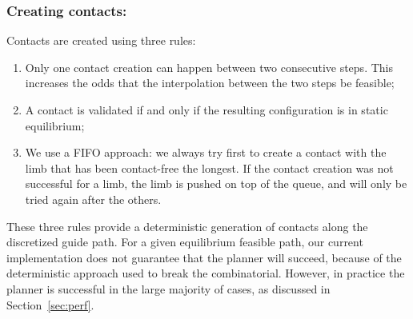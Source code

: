 \subsubsection{Creating contacts:}
Contacts are created using three rules:
\begin{enumerate}
\item Only one contact creation can happen between two consecutive steps. This increases the odds that the interpolation between the two steps be feasible;
\item A contact is validated if and only if the resulting configuration is in static equilibrium; 
\item We use a FIFO approach:  we always try first to create a contact with the limb that has been contact-free the longest. If the contact creation
was not successful for a limb, the limb is pushed on top of the queue, and will only be tried again after the others.
\end{enumerate}

These three rules provide a deterministic generation of contacts along the discretized guide path.
For a given \gls{equilibrium feasible} path, our current implementation does not guarantee that the planner will succeed, because
of the deterministic approach used to break the combinatorial.
However, in practice the planner is successful in the large majority of cases, as discussed in Section~\ref{sec:perf}.
